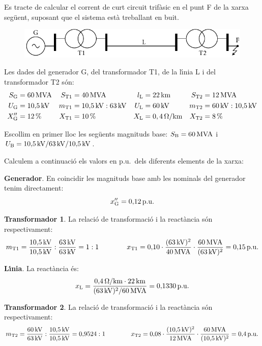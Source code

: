 \begin{exemple}

Es tracte de calcular el corrent de curt circuit trif\`{a}sic en el punt F de la xarxa seg\"{u}ent, suposant
que el sistema est\`{a} treballant en buit.
\begin{figure}[htb]
\vspace{3mm} \centering
    \includegraphics{Imatges/Cap-Fonaments-pu-Circuit1.pdf}
\end{figure}

Les dades del generador G, del transformador T1, de la l\'{\i}nia L i del transformador T2 s\'{o}n:
\begin{align*}
   S_\mathrm{G} &= 60\mathrm{\,MVA} & S_\mathrm{T1} &= 40\mathrm{\,MVA} & l_\mathrm{L} &= 22\mathrm{\,km} & S_\mathrm{T2} &= 12\mathrm{\,MVA} \\
   U_\mathrm{G} &= 10{,}5\mathrm{\,kV} & m_\mathrm{T1} &= 10{,}5\mathrm{\,kV}:63\mathrm{\,kV} & U_\mathrm{L} &= 60\mathrm{\,kV} & m_\mathrm{T2} &= 60\mathrm{\,kV}:10{,}5\mathrm{\,kV} \\
   X''_\mathrm{G} &= 12\mathrm{\,\%} & X_\mathrm{T1} &= 10\mathrm{\,\%} & X_\mathrm{L} &= 0,4\mathrm{\,\mathrm{\Omega}/km} & X_\mathrm{T2} &= 8\mathrm{\,\%}
\end{align*}

Escollim en primer lloc les seg\"{u}ents magnituds base: $S_\mathrm{B} = 60\mathrm{\,MVA}$ i $U_\mathrm{B}
= 10{,}5\mathrm{\,kV} / 63\mathrm{\,kV} / 10{,}5\mathrm{\,kV}$.

Calculem a continuaci\'{o} els valors en p.u.\ dels diferents elements de la xarxa:

\textbf{Generador}. En coincidir les magnituds base amb les nominals del generador tenim
 directament:
\[
x''_\mathrm{G} = 0{,}12\mathrm{\,p.u.}
\]

\textbf{Transformador 1}. La relaci\'{o} de transformaci\'{o} i la react\`{a}ncia s\'{o}n respectivament:
\[
m_\mathrm{T1} = \frac{10{,}5\mathrm{\,kV}}{10{,}5\mathrm{\,kV}} :
\frac{63\mathrm{\,kV}}{63\mathrm{\,kV}} = 1:1 \qquad\qquad x_\mathrm{T1} =
0{,}10 \cdot \frac{(63\mathrm{\,kV})^2}{40\mathrm{\,MVA}} \cdot
\frac{60\mathrm{\,MVA}}{(63\mathrm{\,kV})^2}  = 0{,}15\mathrm{\,p.u.}
\]

\textbf{L\'{\i}nia}. La react\`{a}ncia \'{e}s:
\[x_\mathrm{L} = \frac{0{,}4\mathrm{\,\mathrm{\Omega}/km} \cdot 22\mathrm{\,km}} {(63\mathrm{\,kV})^2/60\mathrm{\,MVA}}  = 0{,}1330\mathrm{\,p.u.}
\]

\textbf{Transformador 2}. La relaci\'{o} de transformaci\'{o} i la react\`{a}ncia s\'{o}n respectivament:
\[
m_\mathrm{T2} = \frac{60\mathrm{\,kV}}{63\mathrm{\,kV}} :
\frac{10{,}5\mathrm{\,kV}}{10{,}5\mathrm{\,kV}} = 0{,}9524:1 \qquad\qquad
x_\mathrm{T2} = 0{,}08 \cdot \frac{(10{,}5\mathrm{\,kV})^2}{12\mathrm{\,MVA}}
\cdot \frac{60\mathrm{\,MVA}}{(10{,}5\mathrm{\,kV})^2}  = 0{,}4\mathrm{\,p.u.}
\]


\end{exemple}
